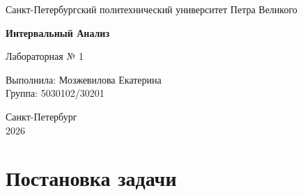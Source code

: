 \documentclass[12pt,a4paper]{article}
\numberwithin{equation}{section}
\newcommand{\studentName}{Мозжевилова Екатерина}
\newcommand{\studentGroup}{5030102/30201}
\begin{document}
\begin{titlepage}
    \centering
    {\large Санкт-Петербургский политехнический университет Петра Великого\par}
    \vfill
    {\Large\bfseries Интервальный Анализ\par}
    \vspace{0.5cm}
    {\large Лабораторная № 1\par}
    \vfill
    \begin{flushright}
        Выполнила: \studentName\\
        Группа: \studentGroup
    \end{flushright}
    \vfill
    Санкт-Петербург\\
    2026
\end{titlepage}

\section{Постановка задачи}
\end{document}
